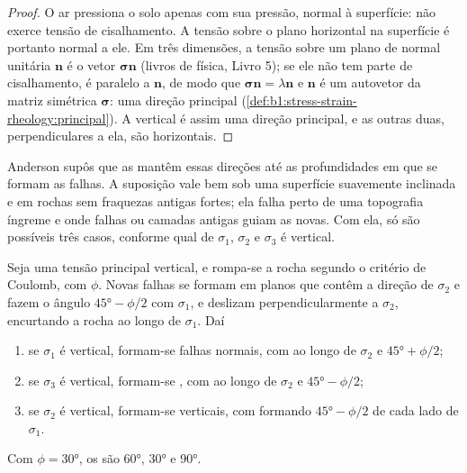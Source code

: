 \begin{proof}
O ar pressiona o solo apenas com sua pressão, normal à superfície: não exerce tensão de cisalhamento. A tensão sobre o plano horizontal na superfície é portanto normal a ele. Em três dimensões, a tensão sobre um plano de normal unitária $\mathbf n$ é o vetor $\boldsymbol\sigma\mathbf n$ (livros de física, Livro 5); se ele não tem parte de cisalhamento, é paralelo a $\mathbf n$, de modo que
$\boldsymbol\sigma\mathbf n = \lambda\mathbf n$ e $\mathbf n$ é um autovetor da matriz simétrica $\boldsymbol\sigma$: uma direção principal (\cref{def:b1:stress-strain-rheology:principal}). A vertical é assim uma direção principal, e as outras duas, perpendiculares a ela, são horizontais.
\end{proof}

Anderson supôs que as  mantêm essas direções até as profundidades em que se formam as falhas. A suposição vale bem sob uma superfície suavemente inclinada e em rochas sem fraquezas antigas fortes; ela falha perto de uma topografia íngreme e onde falhas ou camadas antigas guiam as novas. Com ela, só são possíveis três casos, conforme qual de $\sigma_1$, $\sigma_2$ e
$\sigma_3$ é vertical.

\begin{theorem}\label{thm:b1:faults-folds-fabrics:anderson}
Seja uma tensão principal vertical, e rompa-se a rocha segundo o critério de Coulomb, com  $\phi$. Novas falhas se formam em planos que contêm a direção de $\sigma_2$ e fazem o ângulo $\ang{45} - \phi/2$ com $\sigma_1$, e deslizam perpendicularmente a $\sigma_2$, encurtando a rocha ao longo de $\sigma_1$. Daí
\begin{enumerate}[label=(\alph*)]
  \item se $\sigma_1$ é vertical, formam-se falhas normais, com  ao longo de
        $\sigma_2$ e  $\ang{45} + \phi/2$;
  \item se $\sigma_3$ é vertical, formam-se , com  ao longo de
        $\sigma_2$ e  $\ang{45} - \phi/2$;
  \item se $\sigma_2$ é vertical, formam-se  verticais, com 
        formando $\ang{45} - \phi/2$ de cada lado de $\sigma_1$.
\end{enumerate}
Com $\phi = \ang{30}$, os  são \ang{60}, \ang{30} e \ang{90}.
\end{theorem}

